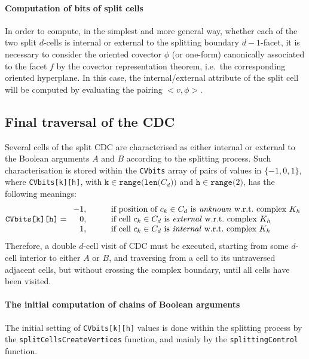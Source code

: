\documentclass[11pt,oneside]{article}	%
\begin{document}
\paragraph{Computation of bits of split cells}

In order to compute, in the simplest and more general way, whether each of the two split $d$-cells is internal or external to the splitting boundary $d-1$-facet, it is necessary to consider the oriented covector $\phi$ (or one-form) canonically associated to the facet $f$ by the covector representation theorem, i.e.~the corresponding oriented hyperplane. In this case, the internal/external attribute of the split cell will be computed by evaluating the pairing $<v,\phi>$.





\subsection{Final traversal of the CDC}

Several cells of the split CDC are characterised as either internal or external to the Boolean arguments $A$ and $B$ according to the splitting process. Such characterisation is stored within the \texttt{CVbits} array of pairs of values in $\{ -1,0,1\}$, where \texttt{CVbits[k][h]}, with $\texttt{k}\in\texttt{range(len(}C_d\texttt{))}$ and $\texttt{h}\in \texttt{range(}2\texttt{)}$, has the following meanings: 
\[
\texttt{CVbits[k][h]} = 
\begin{array}{rcl}
-1, &\quad & \mbox{if position of\ } c_k\in C_d \mbox{\ is \emph{unknown} w.r.t.~complex\ }K_h \\ 
0, &\quad & \mbox{if cell\ }c_k\in C_d \mbox{\ is \emph{external} w.r.t.~complex\ }K_h \\ 
1,  &\quad & \mbox{if cell\ }c_k\in C_d \mbox{\ is \emph{internal} w.r.t.~complex\ }K_h 
\end{array}
\]
Therefore, a double $d$-cell visit of CDC must be executed, starting from some $d$-cell interior to either $A$ or $B$, and traversing from a cell to its untraversed adjacent cells, but without crossing the complex boundary, until all cells have been visited. 

\paragraph{The initial computation of chains of Boolean arguments}

The initial setting of \texttt{CVbits[k][h]} values is done within the splitting process by the \texttt{splitCellsCreateVertices} function, and mainly by the \texttt{splittingControl} function.
\end{document}
